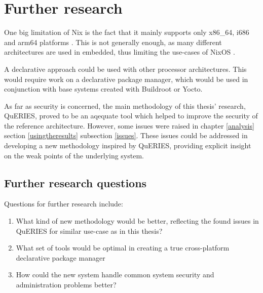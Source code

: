 \chapter{Further research} \label{further}

One big limitation of Nix is the fact that it mainly supports only
x86\_64, i686 and arm64 platforms \cite{nixosNixOSManual}. This is not
generally enough, as many different architectures are used in
embedded, thus limiting the use-cases of
NixOS \cite{fysarakis2014embedded}.

A declarative approach could be used with other processor
architectures. This would require work on a declarative package
manager, which would be used in conjunction with base systems created
with Buildroot or Yocto.

As far as security is concerned, the main methodology of this thesis'
research, QuERIES, proved to be an aqequate tool which helped to improve
the security of the reference architecture. However, some issues were
raised in chapter \ref{analysis} section \ref{usingtheresults}
subsection \ref{issues}. These issues could be addressed in developing
a new methodology inspired by QuERIES, providing explicit insight on
the weak points of the underlying system.

\section{Further research questions}

Questions for further research include:
\begin{enumerate}
  \item{What kind of new methodology would be better, reflecting
    the found issues in QuERIES for similar use-case as in this
    thesis?}
  \item What set of tools would be optimal in creating a true
    cross-platform declarative package manager 
  \item How could the new system handle common system security and
    administration problems better?
    
\end{enumerate}
